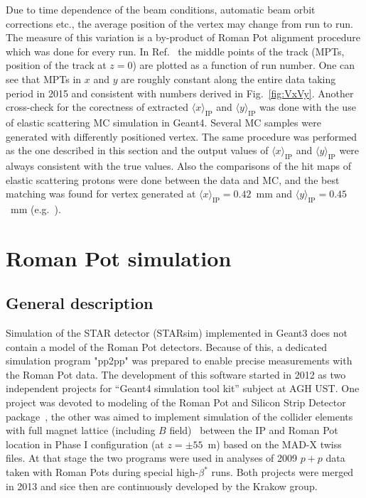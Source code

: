 Due to time dependence of the beam conditions, automatic beam orbit corrections etc., the average position of the vertex may change from run to run. The measure of this variation is a by-product of Roman Pot alignment procedure which was done for every run. In Ref.~\cite{AverageVertexBogdan} the middle points of the track (MPTs, position of the track at $z=0$) are plotted as a function of run number. One can see that MPTs in $x$ and $y$ are roughly constant along the entire data taking period in 2015 and consistent with numbers derived in Fig.~\ref{fig:VxVy}. Another cross-check for the corectness of extracted $\langle x\rangle_{\text{IP}}$ and $\langle y\rangle_{\text{IP}}$ was done with the use of elastic scattering MC simulation in Geant4. Several MC samples were generated with differently positioned vertex. The same procedure was performed as the one described in this section and the output values of $\langle x\rangle_{\text{IP}}$ and $\langle y\rangle_{\text{IP}}$ were always consistent with the true values. Also the comparisons of the hit maps of elastic scattering protons were done between the data and MC, and the best matching was found for vertex generated at $\langle x\rangle_{\text{IP}} = 0.42$~mm and $\langle y\rangle_{\text{IP}} = 0.45$~mm (e.g.~\cite{AlignmentValidation}).


\section{Roman Pot simulation}

\subsection{General description}
Simulation of the STAR detector (STARsim) implemented in Geant3 does not contain a model of the Roman Pot detectors. Because of this, a dedicated simulation program "pp2pp" was prepared to enable precise measurements with the Roman Pot data. The development of this software started in 2012 as two independent projects for ``Geant4 simulation tool kit'' subject at AGH UST. One project was devoted to modeling of the Roman Pot and Silicon Strip Detector package~\cite{BScThesisRafal}, the other was aimed to implement simulation of the collider elements with full magnet lattice (including $B$ field)~\cite{BScThesisLukasz} between the IP and Roman Pot location in Phase I configuration (at $z=\pm55$~m) based on the MAD-X twiss files. At that stage the two programs were used in analyses of 2009 $p+p$ data \cite{MScLukasz,Sikora:2014hca} taken with Roman Pots during special high-$\beta^{*}$ runs. Both projects were merged in 2013 and sice then are continuously developed by the Krakow group.

